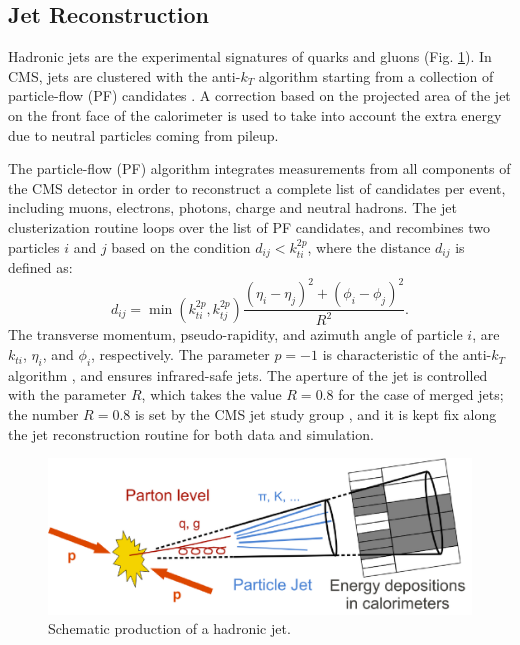 \subsection{Jet Reconstruction}
\label{JetSection}
Hadronic jets are the experimental signatures of quarks and gluons (Fig. \ref{jets}). In CMS, jets are clustered with the anti-$k_T$ algorithm \cite{Cacciari:2008gp} starting from a collection of particle-flow (PF) candidates \cite{CMS:2009nxa,CMS:2010byl}. A correction based on the projected area of the jet on the front face of the calorimeter is used to take into account the extra energy due to neutral particles coming from pileup.  

The particle-flow (PF) algorithm integrates measurements from all components of the CMS detector in order to reconstruct a complete list of candidates per event, including muons, electrons, photons, charge and neutral hadrons. The jet clusterization routine loops over the list of PF candidates, and recombines two particles $i$ and $j$ based on the condition $d_{ij} < k_{ti}^{2p}$, where the distance $d_{ij}$ is defined as: 
\begin{equation}
	d_{ij} = \min(k_{ti}^{2p}, k_{tj}^{2p}) \frac{(\eta_i - \eta_j)^2 + (\phi_i - \phi_j)^2}{R^2}.
\end{equation}
The transverse momentum, pseudo-rapidity, and azimuth angle of particle $i$, are $k_{ti}$, $\eta_i$, and $\phi_i$, respectively. The parameter $p=-1$ is characteristic of the anti-$k_T$ algorithm \cite{Cacciari:2008gp}, and ensures infrared-safe jets. The aperture of the jet is controlled with the parameter $R$, which takes the value $R=0.8$ for the case of merged jets; the number $R=0.8$ is set by the CMS jet study group \cite{Khachatryan:2014vla}, and it is kept fix along the jet reconstruction routine for both data and simulation.

\begin{figure}[ht]
\centering
\includegraphics[scale=0.22]{figures/experiment/CaloJet.png} 
\caption[Collimated spray of particles]{Schematic production of a hadronic jet.}
\label{jets}
\end{figure}

